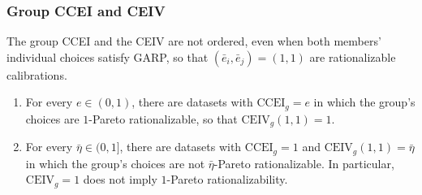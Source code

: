 \documentclass[11 pt]{article}
\begin{document}
\subsubsection{Group CCEI and CEIV}\label{subsec:app_collv2_ccei}

\begin{proposition}\label{prop:app_ccei_ceiv}
The group CCEI and the CEIV are not ordered, even when both members' individual choices satisfy GARP, so that $(\bar e_{i}, \bar e_{j}) = (1,1)$ are rationalizable calibrations.
\begin{enumerate}
\item[(a)] For every $e \in (0,1)$, there are datasets with $\mathrm{CCEI}_{g} = e$ in which the group's choices are $1$-Pareto rationalizable, so that $\mathrm{CEIV}_{g}(1,1) = 1$.
\item[(b)] For every $\bar\eta \in (0,1]$, there are datasets with $\mathrm{CCEI}_{g} = 1$ and $\mathrm{CEIV}_{g}(1,1) = \bar\eta$ in which the group's choices are not $\bar\eta$-Pareto rationalizable. In particular, $\mathrm{CEIV}_{g} = 1$ does not imply $1$-Pareto rationalizability.
\end{enumerate}
\end{proposition}
\end{document}
